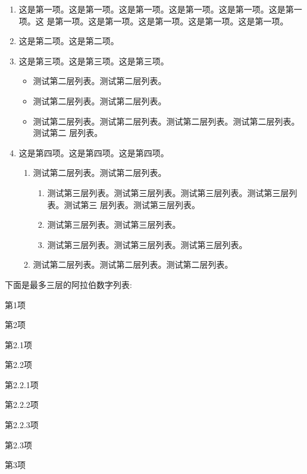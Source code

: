 \documentclass[phd,nobackinfo]{scutthesis}
\begin{document}
\begin{enumerate}
\item 这是第一项。这是第一项。这是第一项。这是第一项。这是第一项。这是第一项。这
  是第一项。这是第一项。这是第一项。这是第一项。这是第一项。
\item 这是第二项。这是第二项。
\item 这是第三项。这是第三项。这是第三项。
  \begin{itemize}
  \item 测试第二层列表。测试第二层列表。
  \item 测试第二层列表。测试第二层列表。
  \item 测试第二层列表。测试第二层列表。测试第二层列表。测试第二层列表。测试第二
    层列表。
  \end{itemize}
\item 这是第四项。这是第四项。这是第四项。
  \begin{enumerate}
  \item 测试第二层列表。测试第二层列表。
  \begin{enumerate}
  \item 测试第三层列表。测试第三层列表。测试第三层列表。测试第三层列表。测试第三
    层列表。测试第三层列表。
  \item 测试第三层列表。测试第三层列表。
  \item 测试第三层列表。测试第三层列表。测试第三层列表。
  \end{enumerate}
  \item 测试第二层列表。测试第二层列表。测试第二层列表。
  \end{enumerate}
\end{enumerate}

下面是最多三层的阿拉伯数字列表:
\begin{arabicenum}
\item 第1项
\item 第2项
  \begin{arabicenum}
  \item 第2.1项
  \item 第2.2项
    \begin{arabicenum}
    \item 第2.2.1项
    \item 第2.2.2项
    \item 第2.2.3项
    \end{arabicenum}
  \item 第2.3项
  \end{arabicenum}
\item 第3项
\end{arabicenum}
\end{document}
